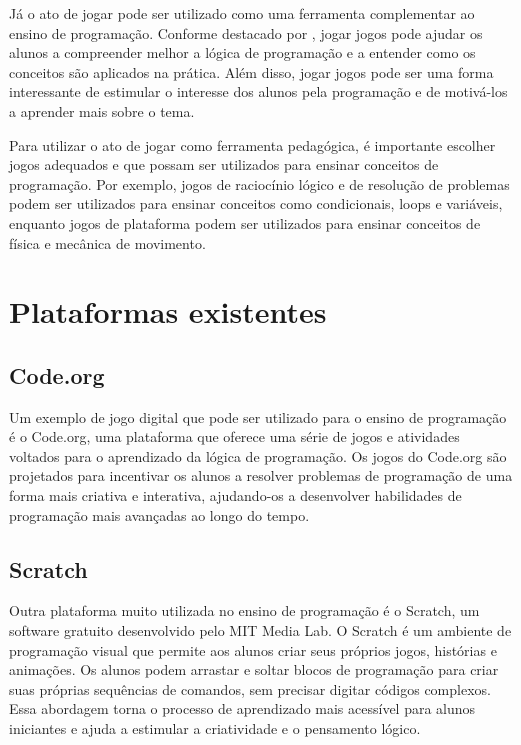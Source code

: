 Já o ato de jogar pode ser utilizado como uma ferramenta complementar ao ensino de programação. Conforme destacado por , jogar jogos pode ajudar os alunos a compreender melhor a lógica de programação e a entender como os conceitos são aplicados na prática. Além disso, jogar jogos pode ser uma forma interessante de estimular o interesse dos alunos pela programação e de motivá-los a aprender mais sobre o tema.

Para utilizar o ato de jogar como ferramenta pedagógica, é importante escolher jogos adequados e que possam ser utilizados para ensinar conceitos de programação. Por exemplo, jogos de raciocínio lógico e de resolução de problemas podem ser utilizados para ensinar conceitos como condicionais, loops e variáveis, enquanto jogos de plataforma podem ser utilizados para ensinar conceitos de física e mecânica de movimento.

\section{Plataformas existentes}

\subsection{Code.org}

Um exemplo de jogo digital que pode ser utilizado para o ensino de programação é o Code.org, uma plataforma que oferece uma série de jogos e atividades voltados para o aprendizado da lógica de programação. Os jogos do Code.org são projetados para incentivar os alunos a resolver problemas de programação de uma forma mais criativa e interativa, ajudando-os a desenvolver habilidades de programação mais avançadas ao longo do tempo.

\subsection{Scratch}

Outra plataforma muito utilizada no ensino de programação é o Scratch, um software gratuito desenvolvido pelo MIT Media Lab. O Scratch é um ambiente de programação visual que permite aos alunos criar seus próprios jogos, histórias e animações. Os alunos podem arrastar e soltar blocos de programação para criar suas próprias sequências de comandos, sem precisar digitar códigos complexos. Essa abordagem torna o processo de aprendizado mais acessível para alunos iniciantes e ajuda a estimular a criatividade e o pensamento lógico.

